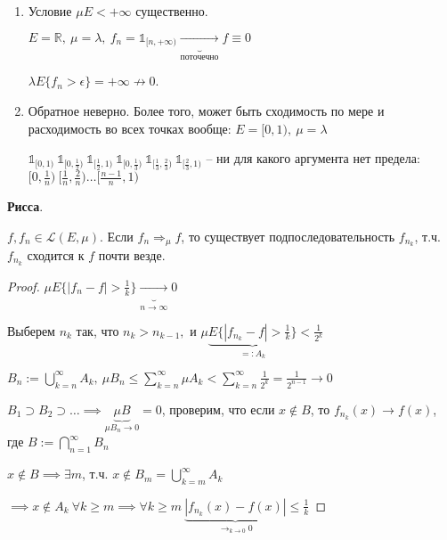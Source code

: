 \begin{remark}
    \begin{enumerate}
        \item {
            Условие $\mu E < +\infty$ существенно.

            $E = \mathbb{R}, \ \mu = \lambda, \ f_n = \mathds{1}_{[n, +\infty)} \underbrace{\rightarrow}_{\text{поточечно}} f \equiv 0$

            $\lambda E \{ f_n > \epsilon \} = +\infty \not \rightarrow 0$.
        }
        \item {
            Обратное неверно. Более того, может быть сходимость по мере и расходимость во всех точках вообще: $E = [0, 1), \ \mu = \lambda$

            $\mathds{1}_{[0, 1)} \ \mathds{1}_{[0, \frac{1}{2})} \ \mathds{1}_{[\frac{1}{2}, 1)} \ \mathds{1}_{[0, \frac{1}{3})} \ \mathds{1}_{[\frac{1}{3}, \frac{2}{3})} \ \mathds{1}_{[\frac{2}{3}, 1)}$ -- ни для какого аргумента нет предела: $[0, \frac{1}{n}) \ [\frac{1}{n}, \frac{2}{n}) \dots [\frac{n - 1}{n}, 1)$
        }
    \end{enumerate}
\end{remark}


\begin{theorem}
    \textbf{Рисса}.

    $f, f_n \in \mathscr{L}(E, \mu)$. Если $f_n \Rightarrow_{\mu} f$, то существует подпоследовательность $f_{n_k}$, т.ч. $f_{n_k}$ сходится к $f$ почти везде.
\end{theorem}
\begin{proof}
    $\mu E \{ |f_n - f| > \frac{1}{k} \} \underbrace{\rightarrow}_{n \rightarrow \infty} 0$

    Выберем $n_k$ так, что $n_k > n_{k - 1},$ и $\mu \underbrace{E \{ |f_{n_k} - f| > \frac{1}{k} \}}_{=: A_k} < \frac{1}{2^k}$

    $B_n := \bigcup_{k=n}^{\infty} A_k, \ \mu B_n \leq \sum_{k=n}^{\infty} \mu A_k < \sum_{k=n}^{\infty} \frac{1}{2^k} = \frac{1}{2^{n - 1}} \rightarrow 0$

    $B_1 \supset B_2 \supset \dots \implies \underbrace{\mu B}_{\mu B_n \rightarrow 0} = 0$, проверим, что если $x \notin B$, то $f_{n_k}(x) \rightarrow f(x)$, где $B := \bigcap_{n=1}^{\infty} B_n$

    $x \notin B \implies \exists m$, т.ч. $x \notin B_m = \bigcup_{k=m}^{\infty} A_k$

    $\implies x \notin A_k \ \forall k \geq m \implies \forall k \geq m \ \underbrace{|f_{n_k}(x) - f(x)|}_{\rightarrow_{k \rightarrow 0} 0} \leq \frac{1}{k}$
\end{proof}

